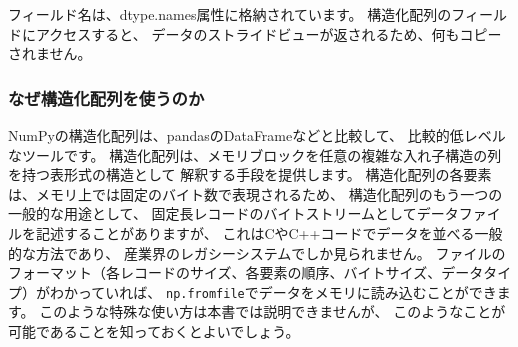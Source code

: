 \documentclass{jsarticle}
\begin{document}
        フィールド名は、dtype.names属性に格納されています。
        構造化配列のフィールドにアクセスすると、
        データのストライドビューが返されるため、何もコピーされません。
        \subsubsection*{なぜ構造化配列を使うのか}
            NumPyの構造化配列は、pandasのDataFrameなどと比較して、
            比較的低レベルなツールです。
            構造化配列は、メモリブロックを任意の複雑な入れ子構造の列を持つ表形式の構造として
            解釈する手段を提供します。
            構造化配列の各要素は、メモリ上では固定のバイト数で表現されるため、
            構造化配列のもう一つの一般的な用途として、
            固定長レコードのバイトストリームとしてデータファイルを記述することがありますが、
            これはCやC++コードでデータを並べる一般的な方法であり、
            産業界のレガシーシステムでしか見られません。
            ファイルのフォーマット（各レコードのサイズ、各要素の順序、バイトサイズ、データタイプ）がわかっていれば、
            \verb|np.fromfile|でデータをメモリに読み込むことができます。
            このような特殊な使い方は本書では説明できませんが、
            このようなことが可能であることを知っておくとよいでしょう。
\end{document}

